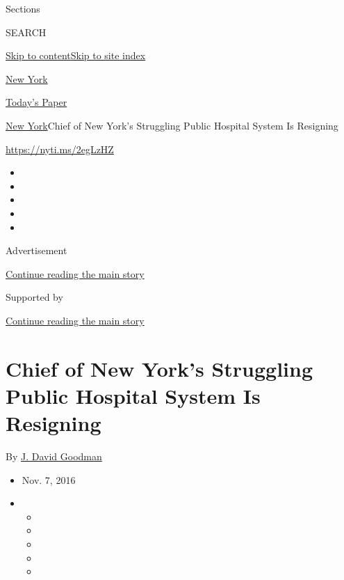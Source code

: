 Sections

SEARCH

\protect\hyperlink{site-content}{Skip to
content}\protect\hyperlink{site-index}{Skip to site index}

\href{https://www.nytimes.com/section/nyregion}{New York}

\href{https://myaccount.nytimes.com/auth/login?response_type=cookie\&client_id=vi}{}

\href{https://www.nytimes.com/section/todayspaper}{Today's Paper}

\href{/section/nyregion}{New York}\textbar{}Chief of New York's
Struggling Public Hospital System Is Resigning

\url{https://nyti.ms/2egLzHZ}

\begin{itemize}
\item
\item
\item
\item
\item
\end{itemize}

Advertisement

\protect\hyperlink{after-top}{Continue reading the main story}

Supported by

\protect\hyperlink{after-sponsor}{Continue reading the main story}

\hypertarget{chief-of-new-yorks-struggling-public-hospital-system-is-resigning}{%
\section{Chief of New York's Struggling Public Hospital System Is
Resigning}\label{chief-of-new-yorks-struggling-public-hospital-system-is-resigning}}

By \href{http://www.nytimes.com/by/j-david-goodman}{J. David Goodman}

\begin{itemize}
\item
  Nov. 7, 2016
\item
  \begin{itemize}
  \item
  \item
  \item
  \item
  \item
  \end{itemize}
\end{itemize}

